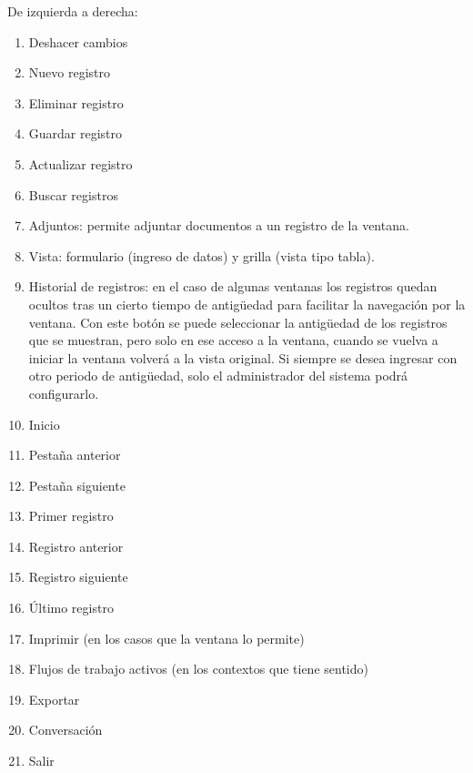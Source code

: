 \documentclass[letterpaper,10pt,spanish]{sphinxmanual}
\begin{document}
De izquierda a derecha:
\begin{enumerate}
\item {} 
Deshacer cambios

\item {} 
Nuevo registro

\item {} 
Eliminar registro

\item {} 
Guardar registro

\item {} 
Actualizar registro

\item {} 
Buscar registros

\item {} 
Adjuntos: permite adjuntar documentos a un registro de la ventana.

\item {} 
Vista:  formulario (ingreso de datos) y grilla (vista tipo tabla).

\item {} 
Historial de registros: en el caso de algunas ventanas los registros quedan ocultos tras un cierto tiempo de antigüedad para facilitar la navegación por la ventana. Con este botón se puede seleccionar la antigüedad de los registros que se muestran, pero solo en ese acceso a la ventana, cuando se vuelva a iniciar la ventana volverá a la vista original. Si siempre se desea ingresar con otro periodo de antigüedad, solo el administrador del sistema podrá configurarlo.

\item {} 
Inicio

\item {} 
Pestaña anterior

\item {} 
Pestaña siguiente

\item {} 
Primer registro

\item {} 
Registro anterior

\item {} 
Registro siguiente

\item {} 
Último registro

\item {} 
Imprimir (en los casos que la ventana lo permite)

\item {} 
Flujos de trabajo activos (en los contextos que tiene sentido)

\item {} 
Exportar

\item {} 
Conversación

\item {} 
Salir

\end{enumerate}
\end{document}
